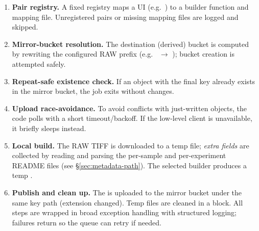 \begin{enumerate}
	\item \textbf{Pair registry.} A fixed registry maps a UI  (e.g.\ ) to a builder function and mapping file. Unregistered pairs or missing mapping files are logged and skipped.
	
	\item \textbf{Mirror-bucket resolution.} The destination (derived) bucket is computed by rewriting the configured RAW prefix (e.g.\  $\to$ ); bucket creation is attempted safely.
	
	\item \textbf{Repeat-safe existence check.} If an object with the final  key already exists in the mirror bucket, the job exits without changes.
	
	\item \textbf{Upload race-avoidance.} To avoid conflicts with just-written objects, the code polls  with a short timeout/backoff. If the low-level client is unavailable, it briefly sleeps instead.
	
	\item \textbf{Local build.} The RAW TIFF is downloaded to a temp file; \emph{extra fields} are collected by reading and parsing the per-sample and per-experiment README files (see \S\ref{sec:metadata-path}). The selected builder produces a temp .
	
	\item \textbf{Publish and clean up.} The  is uploaded to the mirror bucket under the same key path (extension changed). Temp files are cleaned in a  block. All steps are wrapped in broad exception handling with structured logging; failures return  so the queue can retry if needed.
\end{enumerate}

